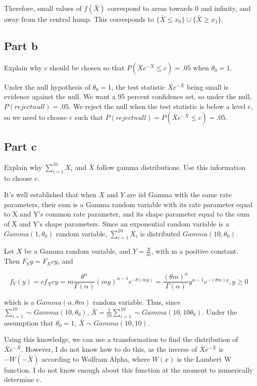 \documentclass{article}
\begin{document}
Therefore, small values of $f(\bar{X})$ correspond to areas towards 0 and infinity, and away from the central hump. This corresponds to $\{\bar{X} \leq x_0\} \cup \{\bar{X} \geq x_1\}$.

\subsection*{Part b}

Explain why $c$ should be chosen so that $P(\bar{X} e^{-\bar{X}} \leq c) = .05$ when $\theta_0 = 1$.

Under the null hypothesis of $\theta_0 = 1$, the test statistic $\bar{X} e^{-\bar{X}}$ being small is evidence against the null. We want a 95 percent confidence set, so under the null, $P(reject null) = .05$. We reject the null when the test statistic is below a level c, so we need to choose c such that $P(reject null) = P(\bar{X} e^{-\bar{X}} \leq c) = .05$.

\subsection*{Part c}

Explain why $\sum_{i=1}^{10} X_i$ and $\bar{X}$ follow gamma distributions. Use this information to choose c.

It's well established that when $X$ and $Y$ are iid Gamma with the same rate parameters, their sum is a Gamma random variable with its rate parameter equal to X and Y's common rate parameter, and its shape parameter equal to the sum of X and Y's shape parameters. Since an exponential random variable is a $Gamma(1, \theta_0)$ random variable, $\sum_{i=1}^{10} X_i$ is distributed $Gamma(10, \theta_0)$.

Let $X$ be a Gamma random variable, and $Y = \frac{X}{m}$, with m a positive constant. Then $F_Y{y} = F_X{cy}$, and

\[
f_Y(y) = cf_X{cy} = m\frac{\theta^\alpha}{\Gamma(\alpha)} (my)^{\alpha-1} e^{-\theta(my)}
= \frac{(\theta m)^\alpha}{\Gamma(\alpha)} y^{\alpha-1} e^{-(\theta m)y}, y \geq 0
\]

which is a $Gamma(\alpha, \theta m)$ random variable. Thus, since $\sum_{i=1}^10 \sim Gamma(10, \theta_0)$, $\bar{X} = \frac{1}{10}\sum_{i=1}^10 \sim Gamma(10, 10\theta_0)$. Under the assumption that $\theta_0 = 1$, $\bar{X} \sim Gamma(10, 10)$.

Using this knowledge, we can use a transformation to find the distribution of $\bar{X}e^{-\bar{X}}$. However, I do not know how to do this, as the inverse of $\bar{X}e^{-\bar{X}}$ is $-W(-\bar{X})$ according to Wolfram Alpha, where $W(x)$ is the Lambert W function. I do not know enough about this function at the moment to numerically determine c.
\end{document}
